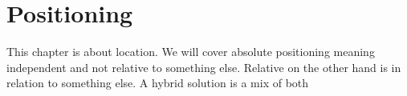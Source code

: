 \chapter{Positioning} \label{ch:positioning}
This chapter is about location. We will cover absolute positioning meaning independent and not relative to something else. Relative on the other hand is in relation to something else. A hybrid solution is a mix of both





